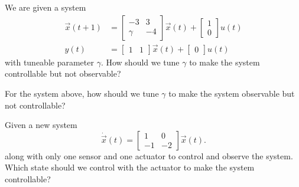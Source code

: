 
\begin{enumerate}

\qitem We are given a system 
\[
\begin{split}
{\vec{x}}(t+1) &= \begin{bmatrix} -3 & 3 \\ \gamma & -4 \end{bmatrix} \vec{x}(t) + \begin{bmatrix} 1 \\ 0 \end{bmatrix} u(t) \\
y(t) &= \begin{bmatrix} 1 & 1 \end{bmatrix} \vec x(t) + \begin{bmatrix} 0 \end{bmatrix} u(t)
\end{split} 
\]
with tuneable parameter $\gamma$. How should we tune $\gamma$ to make the system controllable but not observable? 


\qitem For the system above, how should we tune $\gamma$ to make the system observable but not controllable? 


\qitem Given a new system 
\[
\dot{\vec x}(t) = \begin{bmatrix} 1 & 0 \\ -1 & -2 \end{bmatrix} \vec x(t). 
\]
along with only one sensor and one actuator to control and observe the system. Which state should we control with the actuator to make the system controllable? 


\end{enumerate}
